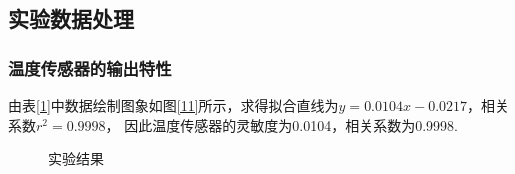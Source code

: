 \documentclass[a4paper,12pt]{article}%
\begin{document}
\subsection{实验数据处理}
\subsubsection{温度传感器的输出特性}
\begin{spacing}{1.528}%
    由表\ref{1}中数据绘制图象如图\ref{11}所示，求得拟合直线为$y = 0.0104x - 0.0217$，相关系数$r^2 = 0.9998$，
    因此温度传感器的灵敏度为0.0104，相关系数为0.9998.
\end{spacing}

\begin{figure}[H]
    \centering
    \quad
    \caption{实验结果}\label{水滴接触角图}
\end{figure}
\end{document}
